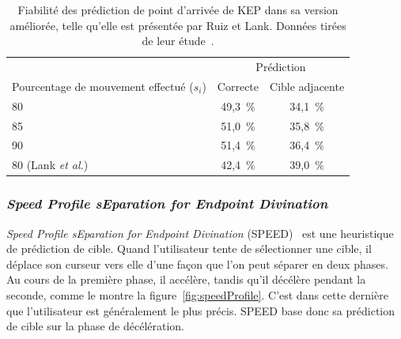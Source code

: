 	\begin{table}
	\centering
	\begin{tabular}{l | c c}
														& \multicolumn{2}{c}{Prédiction}	\\
		Pourcentage de mouvement effectué ($s_{i}$)	& Correcte	& Cible adjacente	\bigstrut[b] \\ \hline
		80												& 49,3~\%{}	& 34,1~\%{}			\bigstrut[t] \\
		85												& 51,0~\%{}	& 35,8~\%{}			\\
		90												& 51,4~\%{}	& 36,4~\%{}			\\
		80 (Lank \emph{et al.})							& 42,4~\%{}	& 39,0~\%{}			\\
	\end{tabular}
	\caption[KEP stable -- fiabilité des prédictions]{Fiabilité des prédiction de point d'arrivée de KEP dans sa version améliorée, telle qu'elle est présentée par Ruiz et Lank. Données tirées de leur étude~\cite{ruiz2009effects}.}
	\label{tab:kepStable}
	\end{table}
		
	\subsubsection{\emph{Speed Profile sEparation for Endpoint Divination}}
	\emph{Speed Profile sEparation for Endpoint Divination} (SPEED)~\cite{wonner2011speed} est une heuristique de prédiction de cible. Quand l'utilisateur tente de sélectionner une cible, il déplace son curseur vers elle d'une façon que l'on peut séparer en deux phases. Au cours de la première phase, il accélère, tandis qu'il décélère pendant la seconde, comme le montre la figure~\ref{fig:speedProfile}. C'est dans cette dernière que l'utilisateur est généralement le plus précis. SPEED base donc sa prédiction de cible sur la phase de décélération.
	
